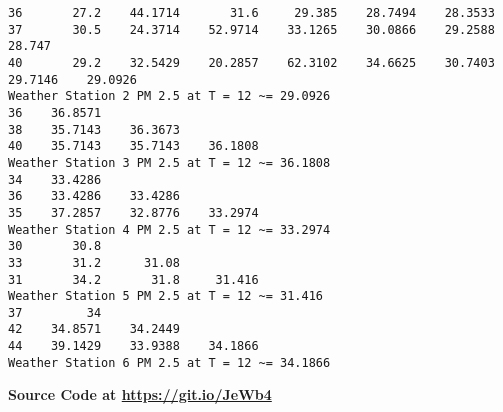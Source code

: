 \documentclass{exam}
\begin{document}
\begin{enumerate}
\begin{verbatim}
36       27.2    44.1714       31.6     29.385    28.7494    28.3533
37       30.5    24.3714    52.9714    33.1265    30.0866    29.2588     28.747
40       29.2    32.5429    20.2857    62.3102    34.6625    30.7403    29.7146    29.0926
Weather Station 2 PM 2.5 at T = 12 ~= 29.0926
36    36.8571
38    35.7143    36.3673
40    35.7143    35.7143    36.1808
Weather Station 3 PM 2.5 at T = 12 ~= 36.1808
34    33.4286
36    33.4286    33.4286
35    37.2857    32.8776    33.2974
Weather Station 4 PM 2.5 at T = 12 ~= 33.2974
30       30.8
33       31.2      31.08
31       34.2       31.8     31.416
Weather Station 5 PM 2.5 at T = 12 ~= 31.416
37         34
42    34.8571    34.2449
44    39.1429    33.9388    34.1866
Weather Station 6 PM 2.5 at T = 12 ~= 34.1866

    \end{verbatim}
    \begin{center}
        \textbf{Source Code at \url{https://git.io/JeWb4}}
    \end{center}
\end{enumerate}
\newpage
\end{document}
